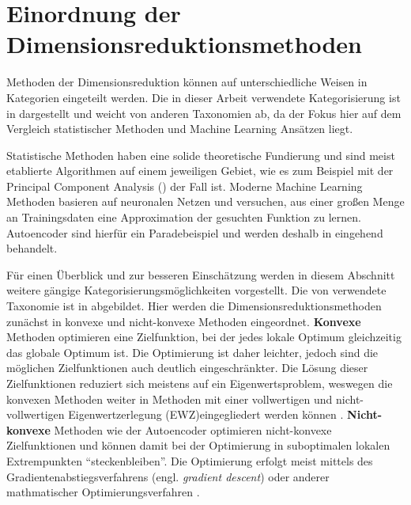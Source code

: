 \section{Einordnung der Dimensionsreduktionsmethoden}
\label{ch:Dimensionsreduktion:Ansaetze}
Methoden der Dimensionsreduktion können auf unterschiedliche Weisen in Kategorien eingeteilt werden. Die in dieser Arbeit verwendete Kategorisierung ist in  dargestellt und weicht von anderen Taxonomien ab, da der Fokus hier auf dem Vergleich statistischer Methoden und Machine Learning Ansätzen liegt.


Statistische Methoden haben eine solide theoretische Fundierung und sind meist etablierte
Algorithmen auf einem jeweiligen Gebiet, wie es zum Beispiel mit der Principal Component Analysis
() der Fall ist. Moderne Machine Learning Methoden
basieren auf neuronalen Netzen und versuchen, aus einer großen Menge an Trainingsdaten eine
Approximation der gesuchten Funktion zu lernen. Autoencoder sind hierfür ein Paradebeispiel und
werden deshalb in  eingehend behandelt.

Für einen Überblick und zur besseren Einschätzung werden in diesem Abschnitt weitere gängige
Kategorisierungsmöglichkeiten vorgestellt. Die von \textcite{vanderMaaten.2009} verwendete
Taxonomie ist in 
abgebildet. Hier werden die
Dimensionsreduktionsmethoden zunächst in konvexe und nicht-konvexe Methoden eingeordnet.
\textbf{Konvexe} Methoden optimieren eine Zielfunktion, bei der jedes lokale Optimum gleichzeitig
das globale Optimum ist. Die Optimierung ist daher leichter, jedoch sind die möglichen
Zielfunktionen auch deutlich eingeschränkter. Die Lösung dieser Zielfunktionen reduziert sich
meistens auf ein Eigenwertsproblem, weswegen die konvexen Methoden weiter in Methoden mit einer
vollwertigen und nicht-vollwertigen Eigenwertzerlegung (EWZ)eingegliedert werden können \parencite[3]{vanderMaaten.2009}. \textbf{Nicht-konvexe} Methoden wie der Autoencoder optimieren
nicht-konvexe Zielfunktionen und können damit bei der Optimierung in suboptimalen lokalen
Extrempunkten \enquote{steckenbleiben}. Die Optimierung erfolgt meist mittels des
Gradientenabstiegsverfahrens (engl. \textit{gradient descent}) oder anderer mathmatischer
Optimierungsverfahren \parencite[siehe z.B.][]{Guler.2010}.

